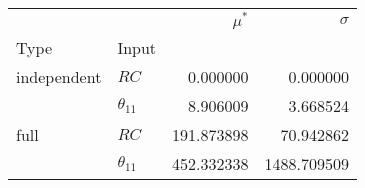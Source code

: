 \begin{tabular}{llrr}
\toprule
     &               &  $\mu^\ast$ &     $\sigma$ \\
Type & Input &             &              \\
\midrule
independent & $RC$ &    0.000000 &     0.000000 \\
     & $\theta_{11}$ &    8.906009 &     3.668524 \\
full & $RC$ &  191.873898 &    70.942862 \\
     & $\theta_{11}$ &  452.332338 &  1488.709509 \\
\bottomrule
\end{tabular}
